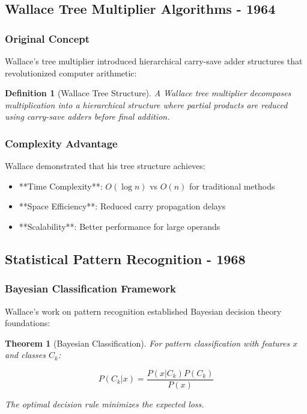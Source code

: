 \documentclass[12pt]{article}
\newtheorem{theorem}{Theorem}
\newtheorem{definition}{Definition}
\begin{document}
\subsection{Wallace Tree Multiplier Algorithms - 1964}

\subsubsection{Original Concept}

Wallace's tree multiplier \cite{wallace_tree_1964} introduced hierarchical carry-save adder structures that revolutionized computer arithmetic:

\begin{definition}[Wallace Tree Structure]
A Wallace tree multiplier decomposes multiplication into a hierarchical structure where partial products are reduced using carry-save adders before final addition.
\end{definition}

\subsubsection{Complexity Advantage}

Wallace demonstrated that his tree structure achieves:
\begin{itemize}
    \item **Time Complexity**: $O(\log n)$ vs $O(n)$ for traditional methods
    \item **Space Efficiency**: Reduced carry propagation delays
    \item **Scalability**: Better performance for large operands
\end{itemize}

\subsection{Statistical Pattern Recognition - 1968}

\subsubsection{Bayesian Classification Framework}

Wallace's work on pattern recognition \cite{wallace_pattern_1968} established Bayesian decision theory foundations:

\begin{theorem}[Bayesian Classification]
For pattern classification with features $x$ and classes $C_k$:

\begin{equation}
P(C_k|x) = \frac{P(x|C_k) P(C_k)}{P(x)}
\end{equation}

The optimal decision rule minimizes the expected loss.
\end{theorem}
\end{document}
